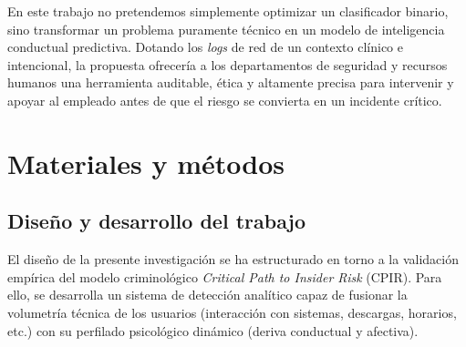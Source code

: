 \documentclass[IB]{TFUOC}%
\begin{document}
\noindent En este trabajo no pretendemos simplemente optimizar un clasificador binario, sino transformar un problema puramente técnico en un modelo de inteligencia conductual predictiva. Dotando los \textit{logs} de red de un contexto clínico e intencional, la propuesta ofrecería a los departamentos de seguridad y recursos humanos una herramienta auditable, ética y altamente precisa para intervenir y apoyar al empleado antes de que el riesgo se convierta en un incidente crítico.



\chapter{Materiales y métodos}

\section{Diseño y desarrollo del trabajo} 
El diseño de la presente investigación se ha estructurado en torno a la validación empírica del modelo criminológico \textit{Critical Path to Insider Risk} (CPIR). Para ello, se desarrolla un sistema de detección analítico capaz de fusionar la volumetría técnica de los usuarios (interacción con sistemas, descargas, horarios, etc.) con su perfilado psicológico dinámico (deriva conductual y afectiva).
\end{document}
